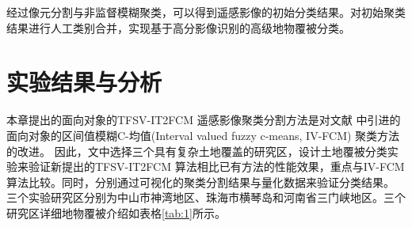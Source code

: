 经过像元分割与非监督模糊聚类，可以得到遥感影像的初始分类结果。对初始聚类结果进行人工类别合并，实现基于高分影像识别的高级地物覆被分类\cite{zhang2011progress}。


\section{实验结果与分析}
\label{sec::chap04-4}


本章提出的面向对象的TFSV-IT2FCM 遥感影像聚类分割方法是对文献\cite{he2016remote} 中引进的面向对象的区间值模糊C-均值(Interval valued fuzzy c-means, IV-FCM) 聚类方法的改进。%
因此，文中选择三个具有复杂土地覆盖的研究区，设计土地覆被分类实验来验证新提出的TFSV-IT2FCM 算法相比已有方法的性能效果，重点与IV-FCM 算法比较。同时，分别通过可视化的聚类分割结果与量化数据来验证分类结果。
三个实验研究区分别为中山市神湾地区、珠海市横琴岛和河南省三门峡地区。三个研究区详细地物覆被介绍如表格\ref{tab:1}所示。


